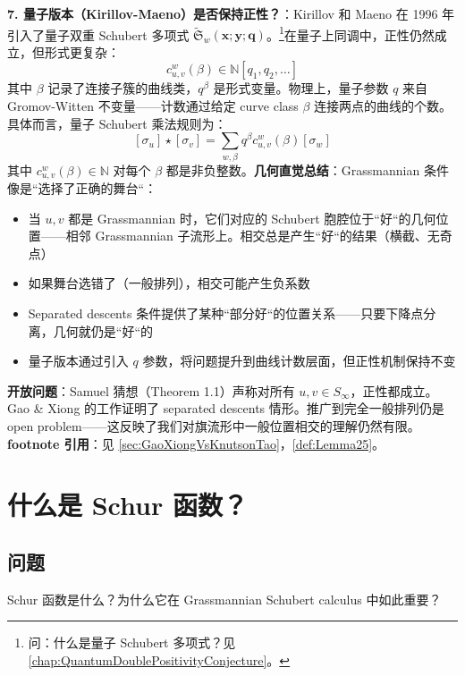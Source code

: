 \textbf{7. 量子版本（Kirillov-Maeno）是否保持正性？}：Kirillov 和 Maeno 在 1996 年引入了量子双重 Schubert 多项式 $\widetilde{\mathfrak{S}}_w(\mathbf{x}; \mathbf{y}; \mathbf{q})$。\footnote{问：什么是量子 Schubert 多项式？见\cref{chap:QuantumDoublePositivityConjecture}。}在量子上同调中，正性仍然成立，但形式更复杂：$$c^w_{u,v}(\beta) \in \mathbb{N}[q_1, q_2, \ldots]$$其中 $\beta$ 记录了连接子簇的曲线类，$q^\beta$ 是形式变量。物理上，量子参数 $q$ 来自 Gromov-Witten 不变量——计数通过给定 curve class $\beta$ 连接两点的曲线的个数。具体而言，量子 Schubert 乘法规则为：$$[\sigma_u] \star [\sigma_v] = \sum_{w,\beta} q^{\beta} c^w_{u,v}(\beta) [\sigma_w]$$其中 $c^w_{u,v}(\beta) \in \mathbb{N}$ 对每个 $\beta$ 都是非负整数。\textbf{几何直觉总结}：Grassmannian 条件像是``选择了正确的舞台``：
\begin{itemize}
\item 当 $u, v$ 都是 Grassmannian 时，它们对应的 Schubert 胞腔位于``好``的几何位置——相邻 Grassmannian 子流形上。相交总是产生``好``的结果（横截、无奇点）
\item 如果舞台选错了（一般排列），相交可能产生负系数
\item Separated descents 条件提供了某种``部分好``的位置关系——只要下降点分离，几何就仍是``好``的
\item 量子版本通过引入 $q$ 参数，将问题提升到曲线计数层面，但正性机制保持不变
\end{itemize}

\textbf{开放问题}：Samuel 猜想（Theorem 1.1）声称对所有 $u, v \in S_\infty$，正性都成立。Gao \& Xiong 的工作证明了 separated descents 情形。推广到完全一般排列仍是 open problem——这反映了我们对旗流形中一般位置相交的理解仍然有限。\textbf{footnote 引用}：见 \cref{sec:GaoXiongVsKnutsonTao}，\cref{def:Lemma25}。
\section{什么是 Schur 函数？}\label{sec:WhatIsSchurFunction}
\subsection{问题}
Schur 函数是什么？为什么它在 Grassmannian Schubert calculus 中如此重要？
